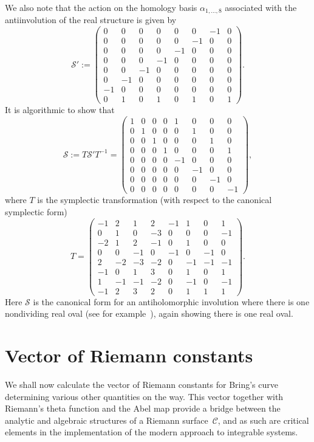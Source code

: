 \documentclass[pdftex]{sigma}
\numberwithin{equation}{section}
\begin{document}
We also note that the action on the homology basis $\alpha_{1,\ldots,8}$ associated
with the antiinvolution of the real structure is given by
\[
\mathcal{S}':=\begin{pmatrix} 0&0&0&0&0&0&-1&0\\
0 &0&0&0&0&-1&0&0\\  0&0&0&0&-1&0&0&0
\\  0&0&0&-1&0&0&0&0\\  0&0&-1&0&0&0
&0&0\\  0&-1&0&0&0&0&0&0\\  -1&0&0&0
&0&0&0&0\\  0&1&0&1&0&1&0&1\end{pmatrix}.
\]
It is algorithmic to show that
\[
\mathcal{S}:=T\mathcal{S}' T^{-1}=\begin{pmatrix} 1&0&0&0&1&0&0&0\\
0 &1&0&0&0&1&0&0\\  0&0&1&0&0&0&1&0
\\  0&0&0&1&0&0&0&1\\  0&0&0&0&-1&0&0
&0\\  0&0&0&0&0&-1&0&0\\  0&0&0&0&0&0
&-1&0\\  0&0&0&0&0&0&0&-1\end{pmatrix},
\]
where $T$ is the symplectic transformation (with respect to the canonical symplectic form)
\[
T= \begin{pmatrix} -1&2&1&2&-1&1&0&1
\\  0&1&0&-3&0&0&0&-1\\  -2&1&2&-1&0
&1&0&0\\  0&0&-1&0&-1&0&-1&0\\  2&-2
&-3&-2&0&-1&-1&-1\\  -1&0&1&3&0&1&0&1
\\  1&-1&-1&-2&0&-1&0&-1\\  -1&2&3&2
&0&1&1&1\end{pmatrix}.
\]
Here $\mathcal{S}$ is the canonical form for an antiholomorphic involution where there is one nondividing
real oval (see for example~\cite{vinnikov}), again showing there is one real oval.



\section{Vector of Riemann constants}\label{section5}

We shall now calculate the vector of Riemann constants for Bring's curve
determining various other quantities on the way. This vector together with
Riemann's theta function and the Abel map provide a
bridge between the analytic and algebraic structures of a Riemann
surface~$\mathcal{C}$, and as such are critical elements in the
implementation of the modern approach to integrable systems.
\end{document}

